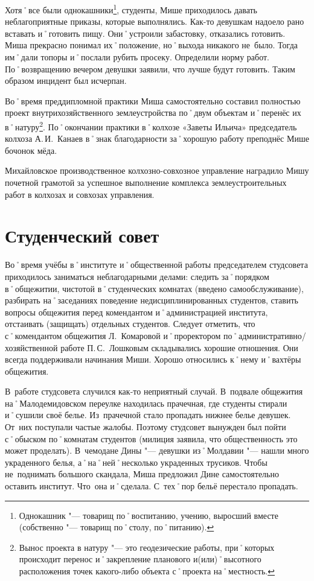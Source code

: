 Хотя˚все были однокашники\footnote{Однокашник "--- товарищ по˚воспитанию, учению, выросший вместе (собственно "--- товарищ по˚столу, по˚питанию).}, студенты, Мише приходилось давать неблагоприятные приказы, которые выполнялись. Как-то девушкам надоело рано вставать и˚готовить пищу. Они˚устроили забастовку, отказались готовить. Миша прекрасно понимал их˚положение, но˚выхода никакого не~было. Тогда им˚дали топоры и˚послали рубить просеку. Определили норму работ. По˚возвращению вечером девушки заявили, что лучше будут готовить. Таким образом инцидент был исчерпан. 

Во˚время преддипломной практики Миша самостоятельно составил полностью проект внутрихозяйственного землеустройства по˚двум объектам и˚перенёс их в˚натуру\footnote{Вынос проекта в натуру "--- это геодезические работы, при˚которых происходит перенос и˚закрепление планового и(или)˚высотного расположения точек какого-либо объекта с˚проекта на˚местность.}. По˚окончании практики в˚колхозе «Заветы Ильича» председатель колхоза А.\,И.~Канаев в˚знак благодарности за˚хорошую работу преподнёс Мише бочонок мёда.

Михайловское производственное колхозно-совхозное управление наградило Мишу почетной грамотой за успешное выполнение комплекса землеустроительных работ в колхозах и совхозах управления.

\section*{Студенческий совет}
\label{sec:studentCouncil}

Во˚время учёбы в˚институте и˚общественной работы председателем студсовета приходилось заниматься неблагодарными делами: следить за˚порядком в˚общежитии, чистотой в˚студенческих комнатах (введено самообслуживание), разбирать на˚заседаниях поведение недисциплинированных студентов, ставить вопросы общежития перед комендантом и˚администрацией института, отстаивать (защищать) отдельных студентов. Следует отметить, что с˚комендантом общежития Л.~Комаровой и˚проректором по˚административно\-/хозяйственной работе П.\,С.~Лошковым складывались хорошие отношения. Они всегда поддерживали начинания Миши. Хорошо относились к˚нему и˚вахтёры общежития.

В~работе студсовета случился как-то неприятный случай. В~подвале общежития на˚Малодемидовском переулке находилась прачечная, где студенты стирали и˚сушили своё белье. Из~прачечной стало пропадать нижнее белье девушек. От~них поступали частые жалобы. Поэтому студсовет вынужден был пойти с˚обыском по˚комнатам студентов (милиция заявила, что общественность это может проделать). В~чемодане Дины "--- девушки из˚Молдавии "--- нашли много украденного белья, а˚на˚ней˚несколько украденных трусиков. Чтобы не~поднимать большого скандала, Миша предложил Дине самостоятельно оставить институт. Что~она и˚сделала. С~тех˚пор бельё перестало пропадать.

